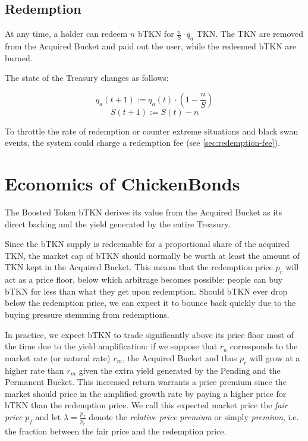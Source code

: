 \documentclass{article}
\begin{document}
\subsection{Redemption}
\label{sec:redemption}
At any time, a holder can redeem $n$ bTKN for $\frac{n}{S}\cdot q_a$ TKN.
The TKN are removed from the Acquired Bucket and paid out the user, while the redeemed bTKN are burned.

The state of the Treasury changes as follows: 

\begin{equation}
  \label{eq:redemption-qa}
    q_a(t+1) := q_a(t) \cdot (1 - \frac{n}{S})
\end{equation}
\begin{equation}
  \label{eq:redemption-S}
    S(t+1) := S(t) - n
\end{equation}

To throttle the rate of redemption or counter extreme situations and black swan events, the system could charge a redemption fee (see \ref{sec:redemption-fee}).

\section{Economics of ChickenBonds}
 \label{sec:economics}
The Boosted Token bTKN derives its value from the Acquired Bucket as its direct backing and the yield generated by the entire Treasury. 

Since the bTKN supply is redeemable for a proportional share of the acquired TKN, the market cap of bTKN should normally be worth at least the amount of TKN kept in the Acquired Bucket. This means that the redemption price $p_r$ will act as a price floor, below which arbitrage becomes possible: people can buy bTKN for less than what they get upon redemption. Should bTKN ever drop below the redemption price, we can expect it to bounce back quickly due to the buying pressure stemming from redemptions.

In practice, we expect bTKN to trade significantly above its price floor most of the time due to the yield amplification: if we suppose that $r_a$ corresponds to the market rate (or natural rate) $r_m$, the Acquired Bucket and thus $p_r$ will grow at a higher rate than $r_m$ given the extra yield generated by the Pending and the Permanent Bucket. This increased return warrants a price premium since the market should price in the amplified growth rate by paying a higher price for bTKN than the redemption price. We call this expected market price the \textit{fair price} $p_f$ and let $\lambda = \frac{p_f}{p_r}$ denote the \textit{relative price premium} or simply \textit{premium}, i.e. the fraction between the fair price and the redemption price.
\end{document}
